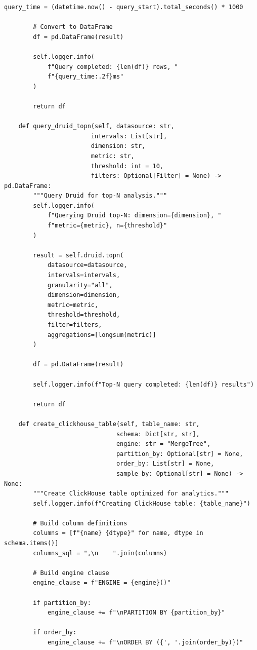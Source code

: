 \begin{lstlisting}[style=python, caption=RealtimeAnalyzer with Sub-Second Query Performance]
        query_time = (datetime.now() - query_start).total_seconds() * 1000

        # Convert to DataFrame
        df = pd.DataFrame(result)

        self.logger.info(
            f"Query completed: {len(df)} rows, "
            f"{query_time:.2f}ms"
        )

        return df

    def query_druid_topn(self, datasource: str,
                        intervals: List[str],
                        dimension: str,
                        metric: str,
                        threshold: int = 10,
                        filters: Optional[Filter] = None) -> pd.DataFrame:
        """Query Druid for top-N analysis."""
        self.logger.info(
            f"Querying Druid top-N: dimension={dimension}, "
            f"metric={metric}, n={threshold}"
        )

        result = self.druid.topn(
            datasource=datasource,
            intervals=intervals,
            granularity="all",
            dimension=dimension,
            metric=metric,
            threshold=threshold,
            filter=filters,
            aggregations=[longsum(metric)]
        )

        df = pd.DataFrame(result)

        self.logger.info(f"Top-N query completed: {len(df)} results")

        return df

    def create_clickhouse_table(self, table_name: str,
                               schema: Dict[str, str],
                               engine: str = "MergeTree",
                               partition_by: Optional[str] = None,
                               order_by: List[str] = None,
                               sample_by: Optional[str] = None) -> None:
        """Create ClickHouse table optimized for analytics."""
        self.logger.info(f"Creating ClickHouse table: {table_name}")

        # Build column definitions
        columns = [f"{name} {dtype}" for name, dtype in schema.items()]
        columns_sql = ",\n    ".join(columns)

        # Build engine clause
        engine_clause = f"ENGINE = {engine}()"

        if partition_by:
            engine_clause += f"\nPARTITION BY {partition_by}"

        if order_by:
            engine_clause += f"\nORDER BY ({', '.join(order_by)})"


\end{lstlisting}
